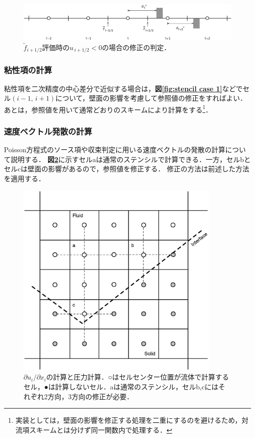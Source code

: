 \begin{figure}[htbp]
\begin{center}
\includegraphics[width=15cm,clip]{stencil_case3.eps}
\end{center}
\caption{$\tilde{f}_{i+1/2}$評価時の$u_{\,i+1/2}<0$の場合の修正の判定．}
\label{fig:stencil case 3}
\end{figure}

%
\subsubsection{粘性項の計算}
粘性項を二次精度の中心差分で近似する場合は，\textbf{図\ref{fig:stencil case 1}}などでセル$(i-1,\,i+1)$について，壁面の影響を考慮して参照値の修正をすればよい．
あとは，参照値を用いて通常どおりのスキームにより計算をする\footnote{実装としては，壁面の影響を修正する処理を二重にするのを避けるため，対流項スキームとは分けず同一関数内で処理する．}．

%
\subsubsection{速度ベクトル発散の計算}
Poisson方程式のソース項や収束判定に用いる速度ベクトルの発散の計算について説明する．
\textbf{図\ref{fig:div operator}}に示すセルaは通常のステンシルで計算できる．一方，セルbとセルcは壁面の影響があるので，参照値を修正する．
修正の方法は前述した方法を適用する．

\begin{figure}[htbp]
\begin{center}
\includegraphics[width=10cm,clip]{div_operator.eps}
\end{center}
\caption{$\partial u_i / \partial x_i$の計算と圧力計算．○はセルセンター位置が流体で計算するセル，●は計算しないセル．aは通常のステンシル，セルb,cにはそれぞれ2方向，3方向の修正が必要．}
\label{fig:div operator}
\end{figure}

